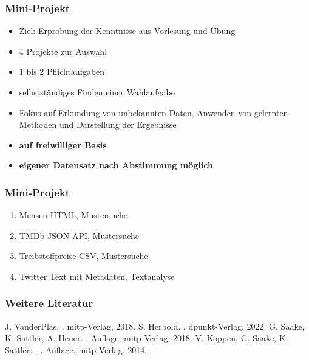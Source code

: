 \begin{frame}

\frametitle{Mini-Projekt}

\begin{itemize}
\item Ziel: Erprobung der Kenntnisse aus Vorlesung und Übung
\item 4 Projekte zur Auswahl
\item 1 bis 2 Pflichtaufgaben
\item selbstständiges Finden einer Wahlaufgabe
\item Fokus auf Erkundung von unbekannten Daten, Anwenden von gelernten Methoden und Darstellung der Ergebnisse
\item \textbf{\color{red} auf freiwilliger Basis}
\item \textbf{\color{red} eigener Datensatz nach Abstimmung möglich}
\end{itemize}

\end{frame}

  
\begin{frame}

\frametitle{Mini-Projekt}

\begin{enumerate}
\item Mensen {\tiny HTML, Mustersuche}
\item TMDb {\tiny JSON API, Mustersuche}
\item Treibstoffpreise {\tiny CSV, Mustersuche}
\item Twitter {\tiny Text mit Metadaten, Textanalyse}
\end{enumerate}

\end{frame}
  
  
  
  \begin{frame}
    \frametitle{Weitere Literatur}
  
    \begin{thebibliography}{Ester, 2000}
     J. VanderPlas.
     . 
     \newblock mitp-Verlag, 2018.  
     S. Herbold.
     . 
     \newblock dpunkt-Verlag, 2022.    
     G. Saake, K. Sattler, A. Heuer.
     . Auflage, mitp-Verlag, 2018.
     V. Köppen, G. Saake, K. Sattler.
     . 
     . Auflage, mitp-Verlag, 2014.    

  \end{thebibliography}
  
  \end{frame}
  

